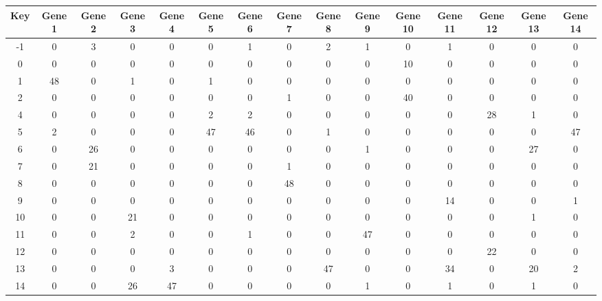 \begin{tabular}{|c|c|c|c|c|c|c|c|c|c|c|c|c|c|c|}
\hline
Key & Gene 1 & Gene 2 & Gene 3 & Gene 4 & Gene 5 & Gene 6 & Gene 7 & Gene 8 & Gene 9 & Gene 10 & Gene 11 & Gene 12 & Gene 13 & Gene 14 \\
\hline
-1 & 0 & 3 & 0 & 0 & 0 & 1 & 0 & 2 & 1 & 0 & 1 & 0 & 0 & 0 \\
0 & 0 & 0 & 0 & 0 & 0 & 0 & 0 & 0 & 0 & 10 & 0 & 0 & 0 & 0 \\
1 & 48 & 0 & 1 & 0 & 1 & 0 & 0 & 0 & 0 & 0 & 0 & 0 & 0 & 0 \\
2 & 0 & 0 & 0 & 0 & 0 & 0 & 1 & 0 & 0 & 40 & 0 & 0 & 0 & 0 \\
4 & 0 & 0 & 0 & 0 & 2 & 2 & 0 & 0 & 0 & 0 & 0 & 28 & 1 & 0 \\
5 & 2 & 0 & 0 & 0 & 47 & 46 & 0 & 1 & 0 & 0 & 0 & 0 & 0 & 47 \\
6 & 0 & 26 & 0 & 0 & 0 & 0 & 0 & 0 & 1 & 0 & 0 & 0 & 27 & 0 \\
7 & 0 & 21 & 0 & 0 & 0 & 0 & 1 & 0 & 0 & 0 & 0 & 0 & 0 & 0 \\
8 & 0 & 0 & 0 & 0 & 0 & 0 & 48 & 0 & 0 & 0 & 0 & 0 & 0 & 0 \\
9 & 0 & 0 & 0 & 0 & 0 & 0 & 0 & 0 & 0 & 0 & 14 & 0 & 0 & 1 \\
10 & 0 & 0 & 21 & 0 & 0 & 0 & 0 & 0 & 0 & 0 & 0 & 0 & 1 & 0 \\
11 & 0 & 0 & 2 & 0 & 0 & 1 & 0 & 0 & 47 & 0 & 0 & 0 & 0 & 0 \\
12 & 0 & 0 & 0 & 0 & 0 & 0 & 0 & 0 & 0 & 0 & 0 & 22 & 0 & 0 \\
13 & 0 & 0 & 0 & 3 & 0 & 0 & 0 & 47 & 0 & 0 & 34 & 0 & 20 & 2 \\
14 & 0 & 0 & 26 & 47 & 0 & 0 & 0 & 0 & 1 & 0 & 1 & 0 & 1 & 0 \\
\hline
\end{tabular}